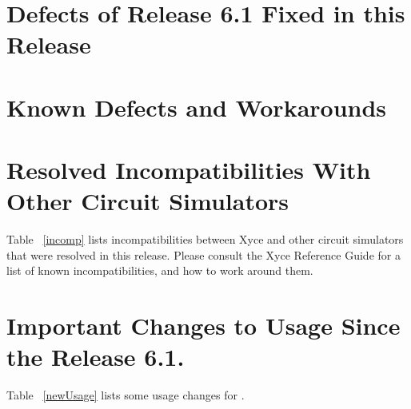 \documentclass[11pt,report,strict]{SANDreport}
\begin{document}
\newpage
\section{Defects of Release 6.1 Fixed in this Release}


\newpage

\section{Known Defects and Workarounds}

\newpage

\section{Resolved Incompatibilities With Other Circuit Simulators}
Table ~\ref{incomp} lists incompatibilities between Xyce{} and other circuit
simulators that were resolved in this release.  Please consult the Xyce{} Reference
Guide for a list of known incompatibilities, and how to work around them.


\newpage
\section{Important Changes to \Xyce{} Usage Since the Release 6.1.}
Table ~\ref{newUsage} lists some usage changes for \Xyce{}.


\clearpage

\begin{SANDdistribution}[NM]%

    \bigskip



\end{SANDdistribution}
\end{document}
